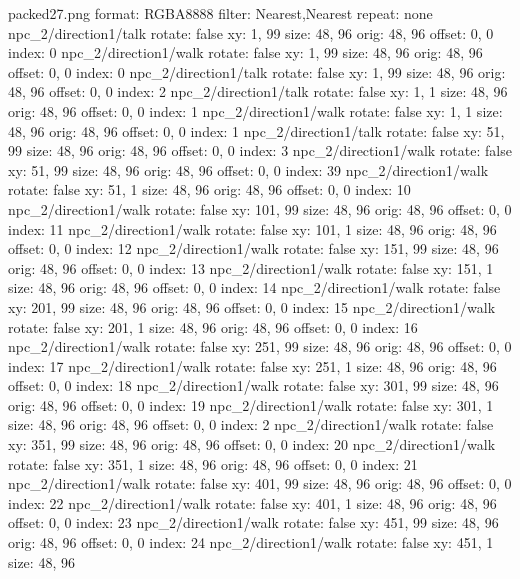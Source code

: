 packed27.png
format: RGBA8888
filter: Nearest,Nearest
repeat: none
npc_2/direction1/talk
  rotate: false
  xy: 1, 99
  size: 48, 96
  orig: 48, 96
  offset: 0, 0
  index: 0
npc_2/direction1/walk
  rotate: false
  xy: 1, 99
  size: 48, 96
  orig: 48, 96
  offset: 0, 0
  index: 0
npc_2/direction1/talk
  rotate: false
  xy: 1, 99
  size: 48, 96
  orig: 48, 96
  offset: 0, 0
  index: 2
npc_2/direction1/talk
  rotate: false
  xy: 1, 1
  size: 48, 96
  orig: 48, 96
  offset: 0, 0
  index: 1
npc_2/direction1/walk
  rotate: false
  xy: 1, 1
  size: 48, 96
  orig: 48, 96
  offset: 0, 0
  index: 1
npc_2/direction1/talk
  rotate: false
  xy: 51, 99
  size: 48, 96
  orig: 48, 96
  offset: 0, 0
  index: 3
npc_2/direction1/walk
  rotate: false
  xy: 51, 99
  size: 48, 96
  orig: 48, 96
  offset: 0, 0
  index: 39
npc_2/direction1/walk
  rotate: false
  xy: 51, 1
  size: 48, 96
  orig: 48, 96
  offset: 0, 0
  index: 10
npc_2/direction1/walk
  rotate: false
  xy: 101, 99
  size: 48, 96
  orig: 48, 96
  offset: 0, 0
  index: 11
npc_2/direction1/walk
  rotate: false
  xy: 101, 1
  size: 48, 96
  orig: 48, 96
  offset: 0, 0
  index: 12
npc_2/direction1/walk
  rotate: false
  xy: 151, 99
  size: 48, 96
  orig: 48, 96
  offset: 0, 0
  index: 13
npc_2/direction1/walk
  rotate: false
  xy: 151, 1
  size: 48, 96
  orig: 48, 96
  offset: 0, 0
  index: 14
npc_2/direction1/walk
  rotate: false
  xy: 201, 99
  size: 48, 96
  orig: 48, 96
  offset: 0, 0
  index: 15
npc_2/direction1/walk
  rotate: false
  xy: 201, 1
  size: 48, 96
  orig: 48, 96
  offset: 0, 0
  index: 16
npc_2/direction1/walk
  rotate: false
  xy: 251, 99
  size: 48, 96
  orig: 48, 96
  offset: 0, 0
  index: 17
npc_2/direction1/walk
  rotate: false
  xy: 251, 1
  size: 48, 96
  orig: 48, 96
  offset: 0, 0
  index: 18
npc_2/direction1/walk
  rotate: false
  xy: 301, 99
  size: 48, 96
  orig: 48, 96
  offset: 0, 0
  index: 19
npc_2/direction1/walk
  rotate: false
  xy: 301, 1
  size: 48, 96
  orig: 48, 96
  offset: 0, 0
  index: 2
npc_2/direction1/walk
  rotate: false
  xy: 351, 99
  size: 48, 96
  orig: 48, 96
  offset: 0, 0
  index: 20
npc_2/direction1/walk
  rotate: false
  xy: 351, 1
  size: 48, 96
  orig: 48, 96
  offset: 0, 0
  index: 21
npc_2/direction1/walk
  rotate: false
  xy: 401, 99
  size: 48, 96
  orig: 48, 96
  offset: 0, 0
  index: 22
npc_2/direction1/walk
  rotate: false
  xy: 401, 1
  size: 48, 96
  orig: 48, 96
  offset: 0, 0
  index: 23
npc_2/direction1/walk
  rotate: false
  xy: 451, 99
  size: 48, 96
  orig: 48, 96
  offset: 0, 0
  index: 24
npc_2/direction1/walk
  rotate: false
  xy: 451, 1
  size: 48, 96
